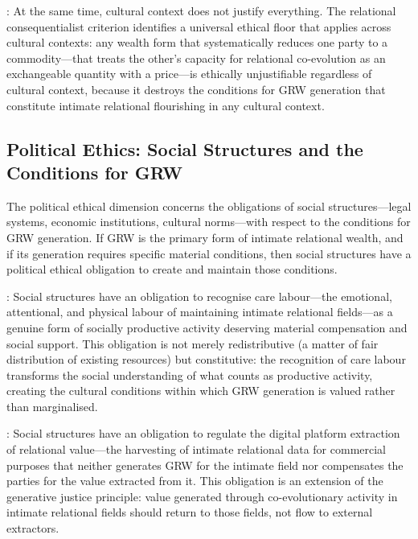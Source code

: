 : At the same time, cultural context does not justify everything. The relational consequentialist criterion identifies a universal ethical floor that applies across cultural contexts: any wealth form that systematically reduces one party to a commodity---that treats the other's capacity for relational co-evolution as an exchangeable quantity with a price---is ethically unjustifiable regardless of cultural context, because it destroys the conditions for GRW generation that constitute intimate relational flourishing in any cultural context.

\subsection{Political Ethics: Social Structures and the Conditions for GRW}
\label{p15:subsec:political_ethics}

\noindent
The political ethical dimension concerns the obligations of social structures---legal systems, economic institutions, cultural norms---with respect to the conditions for GRW generation. If GRW is the primary form of intimate relational wealth, and if its generation requires specific material conditions, then social structures have a political ethical obligation to create and maintain those conditions.

: Social structures have an obligation to recognise care labour---the emotional, attentional, and physical labour of maintaining intimate relational fields---as a genuine form of socially productive activity deserving material compensation and social support. This obligation is not merely redistributive (a matter of fair distribution of existing resources) but constitutive: the recognition of care labour transforms the social understanding of what counts as productive activity, creating the cultural conditions within which GRW generation is valued rather than marginalised.

: Social structures have an obligation to regulate the digital platform extraction of relational value---the harvesting of intimate relational data for commercial purposes that neither generates GRW for the intimate field nor compensates the parties for the value extracted from it. This obligation is an extension of the generative justice principle: value generated through co-evolutionary activity in intimate relational fields should return to those fields, not flow to external extractors.

